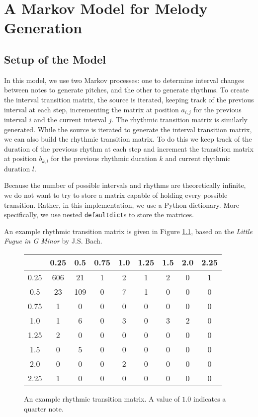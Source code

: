 \chapter{A Markov Model for Melody Generation} \label{melody:markov}

\section{Setup of the Model}

In this model, we use two Markov processes: one to determine interval changes between notes to generate pitches, and the other to generate rhythms.
To create the interval transition matrix, the source is iterated, keeping track of the previous interval at each step, incrementing the matrix at position $a_{i,j}$ for the previous interval $i$ and the current interval $j$.
The rhythmic transition matrix is similarly generated.
While the source is iterated to generate the interval transition matrix, we can also build the rhythmic transition matrix.
To do this we keep track of the duration of the previous rhythm at each step and increment the transition matrix at position $b_{k,l}$ for the previous rhythmic duration $k$ and current rhythmic duration $l$.

Because the number of possible intervals and rhythms are theoretically infinite, we do not want to try to store a matrix capable of holding every possible transition.
Rather, in this implementation, we use a Python dictionary.
More specifically, we use nested \texttt{defaultdict}s to store the matrices.

An example rhythmic transition matrix is given in Figure \ref{fig:rhythmTransitionMatrix}, based on the \textit{Little Fugue in G Minor} by J.S. Bach.

\begin{figure}
	\centering
	\begin{tabular}{c | c c c c c c c c}
		& 0.25 & 0.5 & 0.75 & 1.0 & 1.25 & 1.5 & 2.0 & 2.25\\
		\hline
		0.25 & 606 & 21 & 1 & 2 & 1 & 2 & 0 & 1\\
		0.5 & 23 & 109 & 0 & 7 & 1 & 0 & 0 & 0\\
		0.75 & 1 & 0 & 0 & 0 & 0 & 0 & 0 & 0\\
		1.0 & 1 & 6 & 0 & 3 & 0 & 3 & 2 & 0\\
		1.25 & 2 & 0 & 0 & 0 & 0 & 0 & 0 & 0\\
		1.5 & 0 & 5 & 0 & 0 & 0 & 0 & 0 & 0\\
		2.0 & 0 & 0 & 0 & 2 & 0 & 0 & 0 & 0\\
		2.25 & 1 & 0 & 0 & 0 & 0 & 0 & 0 & 0
	\end{tabular}
	\caption{An example rhythmic transition matrix. A value of $1.0$ indicates a quarter note.}
	\label{fig:rhythmTransitionMatrix}
\end{figure}


